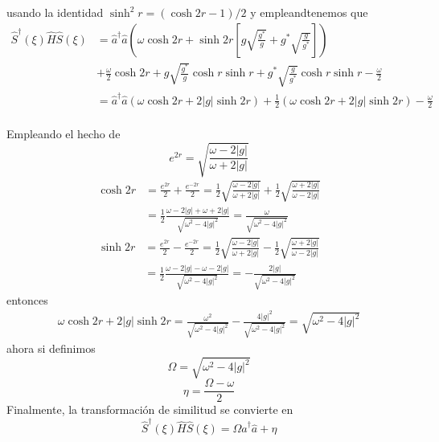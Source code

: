 usando la identidad $\sinh^{2}r = (\cosh{2r}-1)/2$ y empleandtenemos que
\begin{align*}
	\hat{S}^{\dagger}(\xi) \hat{H} \hat{S}(\xi) & = \hat{a}^{\dagger}\hat{a} \left( \omega \cosh{2r} + \sinh{2r} \left[ g \sqrt{\frac{g^{*}}{g}} + g^{*} \sqrt{\frac{g}{g^{*}}} \right] \right)                              \\
	                                            & + \frac{\omega}{2} \cosh{2r} + g \sqrt{\frac{g^{*}}{g}} \cosh{r}\sinh{r} + g^{*}\sqrt{\frac{g}{g^{*}}}\cosh{r}\sinh{r}-\frac{\omega}{2}                                    \\
	                                            & = \hat{a}^{\dagger}\hat{a} \left( \omega \cosh{2r} + 2\vert g\vert \sinh{2r} \right) + \frac{1}{2}\left(\omega\cosh{2r} + 2\vert g \vert \sinh{2r}\right)-\frac{\omega}{2} \\
\end{align*}

Empleando el hecho de
\begin{equation*}
	e^{2r} = \sqrt{\frac{\omega-2\vert g\vert}{\omega+2\vert g\vert}}
\end{equation*}
\begin{align*}
	\cosh{2r} & = \frac{e^{2r}}{2} + \frac{e^{-2r}}{2} = \frac{1}{2} \sqrt{\frac{\omega-2\vert g\vert}{\omega+2\vert g\vert}} + \frac{1}{2} \sqrt{\frac{\omega+2\vert g\vert}{\omega-2\vert g\vert}} \\
	          & = \frac{1}{2} \frac{\omega-2\vert g\vert + \omega + 2\vert g\vert}{\sqrt{\omega^{2}-4\vert g\vert^{2}}} = \frac{\omega}{\sqrt{\omega^{2}-4\vert g\vert^{2}}}
\end{align*}
\begin{align*}
	\sinh{2r} & = \frac{e^{2r}}{2} - \frac{e^{-2r}}{2} = \frac{1}{2} \sqrt{\frac{\omega-2\vert g\vert}{\omega+2\vert g\vert}} - \frac{1}{2} \sqrt{\frac{\omega+2\vert g\vert}{\omega-2\vert g\vert}} \\
	          & = \frac{1}{2} \frac{\omega-2\vert g\vert - \omega - 2\vert g\vert}{\sqrt{\omega^{2}-4\vert g\vert^{2}}} = - \frac{2\vert g\vert}{\sqrt{\omega^{2}-4\vert g\vert^{2}}}
\end{align*}
entonces
\begin{align*}
	\omega \cosh{2r} + 2\vert g\vert \sinh{2r} = \frac{\omega^{2}}{\sqrt{\omega^{2}-4\vert g\vert^{2}}} - \frac{4\vert g\vert^{2}}{\sqrt{\omega^{2}-4\vert g\vert^{2}}} = \sqrt{\omega^{2}-4\vert g\vert^{2}}
\end{align*}
ahora si definimos
\begin{equation*}
	\Omega = \sqrt{\omega^{2}-4\vert g\vert^{2}}
\end{equation*}
\begin{equation*}
	\eta = \frac{\Omega - \omega}{2}
\end{equation*}
Finalmente, la transformación de similitud se convierte en
\begin{equation*}
	\hat{S}^{\dagger}(\xi) \hat{H} \hat{S}(\xi) = \Omega \hat{a}^{\dagger}\hat{a} + \eta
\end{equation*}
